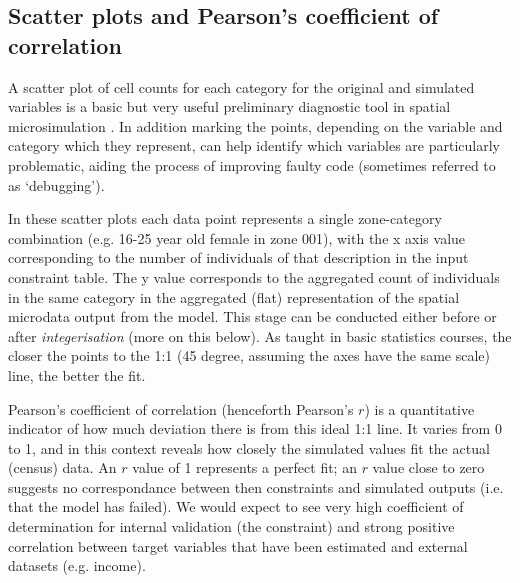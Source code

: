 \documentclass[a4paper,10pt]{article}
\begin{document}
\subsection{Scatter plots and Pearson's coefficient of correlation}
A scatter plot of cell counts for each category for the original and simulated variables is 
a basic but very useful preliminary diagnostic tool in spatial microsimulation
\citep{Ballas2005;Edwards2009}.
In addition marking the points, depending on the 
variable and category %
which they represent, can help identify which variables are particularly problematic, 
aiding the process of improving faulty code (sometimes referred to as `debugging').  

In these scatter plots each data point represents a single zone-category 
combination (e.g. 16-25 year old female in zone 001), with the x axis value corresponding 
to the number of individuals of that description in the input constraint table. 
The y value corresponds to the 
aggregated count of individuals in the same category in the aggregated 
(flat) representation of the spatial microdata output from the model. %
This stage can be conducted either before or after \emph{integerisation} 
(more on this below). As taught in basic statistics courses, the closer the points to the 
1:1 (45 degree, assuming the axes have the same scale) line, the better the fit. 

Pearson's coefficient of correlation (henceforth Pearson's $r$) is a quantitative 
indicator of how much deviation there is from this ideal 1:1 line. It varies from 0 to 1, 
and in this context reveals how closely the simulated values fit the actual (census) data. 
An $r$ value of 1 represents a perfect fit; an $r$ value close to zero suggests no correspondance
between then constraints and simulated outputs (i.e. that the model has failed). 
We would expect to see very high coefficient of determination for 
internal validation (the constraint) and strong
positive correlation between target variables that have been estimated and 
external datasets (e.g. income).
\end{document}
